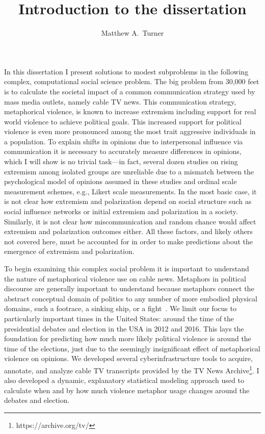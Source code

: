 \documentclass[11pt,letterpaper]{article}
\title{Introduction to the dissertation}
\author{{Matthew A.~Turner}}
\begin{document}
\maketitle

In this dissertation I present solutions to modest subproblems in
the following complex, computational social science problem. 
The big problem from 30,000 feet is to calculate the societal impact of a common
communication strategy used by mass media outlets, namely cable TV news. 
This communication strategy, metaphorical violence, is known to increase 
extremism including support for real world violence to achieve political goals. 
This increased support for political violence is even more pronounced among the most trait 
aggressive individuals in a population. To explain shifts in opinions due to
interpersonal influence via communication it is necessary to accurately measure 
differences in opinions, which I will show is no trivial task---in fact, several
dozen studies on rising extremism among isolated groups are unreliable due to
a mismatch between the psychological model of opinions assumed in these 
studies and ordinal scale measurement schemes, e.g., Likert scale measurements.
In the most basic case, it is not clear how extremism and polarization depend
on social structure such as social influence networks or initial extremism
and polarization in a society. Similarly, it is not clear how miscommunication
and random chance would affect extremism and polarization outcomes either.
All these factors, and likely others not covered here, must be accounted for
in order to make predictions about the emergence of extremism and polarization.

To begin examining this complex social problem it is important to understand
the nature of metaphorical violence use on cable news. Metaphors in
political discourse are generally important to understand because metaphors
connect the abstract conceptual domain of politics to any number of more
embodied physical domains, such a footrace, a sinking ship, or a fight~\cite{Charteris-Black2009}.
We limit our focus to particularly important times in the United
States: around the time of the presidential debates and election in the 
USA in 2012 and 2016. This lays the foundation for predicting how much
more likely political violence is around the time of the elections, just due
to the seemingly insignificant effect of metaphorical violence on opinions.
We developed several cyberinfrastructure tools to 
acquire, annotate, and analyze cable TV transcripts provided by the TV News
Archive\footnote{https://archive.org/tv/}. I also developed a dynamic, explanatory 
statistical modeling approach used to calculate when and by how much violence metaphor 
usage changes around the debates and election.
\end{document}
